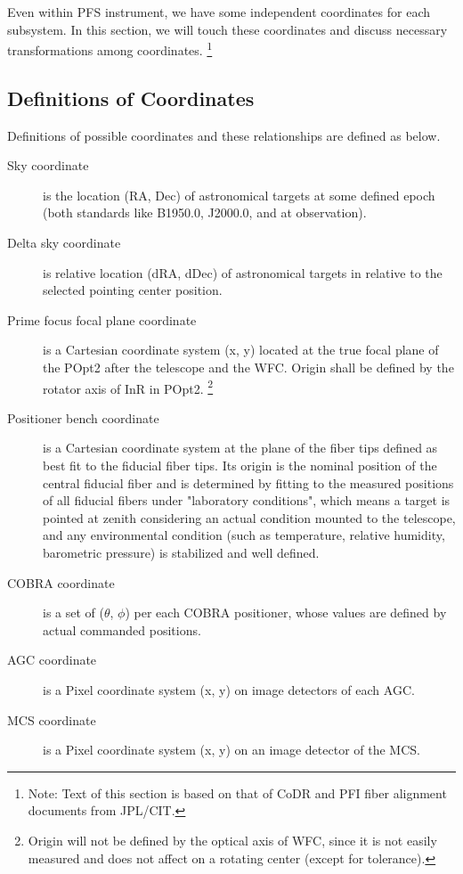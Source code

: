 \documentclass[a4paper,notitlepage]{article}
\begin{document}
Even within PFS instrument, we have some independent coordinates for each 
subsystem. In this section, we will touch these coordinates and discuss 
necessary transformations among coordinates.
\footnote{Note: Text of this section is based on that of CoDR and PFI fiber 
alignment documents from JPL/CIT.}

\subsection{Definitions of Coordinates}

Definitions of possible coordinates and these relationships are defined 
as below.

\begin{description}
  \item[Sky coordinate]
    is the location (RA, Dec) of astronomical targets at some defined epoch
    (both standards like B1950.0, J2000.0, and at observation).
  \item[Delta sky coordinate] 
    is relative location (dRA, dDec) of astronomical targets in relative to 
    the selected pointing center position. 
  \item[Prime focus focal plane coordinate] 
    is a Cartesian coordinate system (x, y) located at the true focal plane
    of the POpt2 after the telescope and the WFC. 
    Origin shall be defined by the rotator axis of InR in POpt2.
    \footnote{Origin will not be defined by the optical axis of WFC, since 
    it is not easily measured and does not affect on a rotating center (except 
    for tolerance).}
  \item[Positioner bench coordinate] 
    is a Cartesian coordinate system at the plane of the fiber tips defined as 
    best fit to the fiducial fiber tips. Its origin is the nominal position 
    of the central fiducial fiber and is determined by fitting to the measured 
    positions of all fiducial fibers under "laboratory conditions", which 
    means a target is pointed at zenith considering an actual condition 
    mounted to the telescope, and any environmental condition (such as 
    temperature, relative humidity, barometric pressure) is stabilized 
    and well defined. 
  \item[COBRA coordinate] 
    is a set of ($\theta$, $\phi$) per each COBRA positioner, whose values are 
    defined by actual commanded positions. 
  \item[AGC coordinate] 
    is a Pixel coordinate system (x, y) on image detectors of each AGC.
  \item[MCS coordinate] 
    is a Pixel coordinate system (x, y) on an image detector of the MCS.
\end{description}
\end{document}
